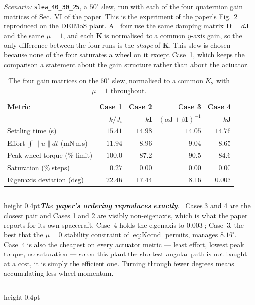 \documentclass[conference,10pt,a4paper]{IEEEtran}
\newcommand{\remarkrule}{\par\nobreak\vspace{2pt}%
  \hrule height 0.4pt\vspace{4pt}\nobreak}
\newenvironment{keybox}[1][Result]
  {\par\medskip\remarkrule\noindent\small\textbf{\textit{#1.}}\ \ignorespaces}
  {\par\vspace{3pt}\hrule height 0.4pt\par\medskip\ignorespacesafterend}
\newcommand{\mat}[1]{\bm{#1}}
\begin{document}
\textit{Scenario:} \texttt{slew\_40\_30\_25}, a $50^\circ$ slew, run with each
of the four quaternion gain matrices of Sec.~VI of the paper. This is the
experiment of the paper's Fig.~2 reproduced on the DEIMoS plant. All four use
the same damping matrix $\mat{D}=d\mat{J}$ and the same $\mu=1$, and each
$\mat{K}$ is normalised to a common $y$-axis gain, so the only difference
between the four runs is the \emph{shape} of $\mat{K}$. This slew is chosen
because none of the four saturates a wheel on it except Case~1, which keeps the
comparison a statement about the gain structure rather than about the actuator.

\begin{table}[!t]
\centering
\caption{The four gain matrices on the $50^\circ$ slew, normalised to a common
$K_2$ with $\mu=1$ throughout.}
\label{tab:compare}
\footnotesize
\begin{tabular}{@{}lrrrr@{}}
\toprule
\textbf{Metric} & \textbf{Case 1} & \textbf{Case 2} & \textbf{Case 3} & \textbf{Case 4} \\
 & $k/J_i$ & $k\mat{I}$ & $(\alpha\mat{J}{+}\beta\mat{I})^{-1}$ & $k\mat{J}$ \\
\midrule
Settling time (s)              & $15.41$ & $14.98$ & $14.05$ & $14.76$ \\
Effort $\int\|u\|dt$ (mN\,m\,s)& $11.94$ & $8.96$  & $9.04$  & $\bm{8.65}$ \\
Peak wheel torque (\% limit)   & $100.0$ & $87.2$  & $90.5$  & $\bm{84.6}$ \\
Saturation (\% steps)          & $0.27$  & $0.00$  & $0.00$  & $\bm{0.00}$ \\
Eigenaxis deviation (deg)      & $22.46$ & $17.44$ & $8.16$  & $\bm{0.003}$ \\
\bottomrule
\end{tabular}
\end{table}

\begin{keybox}[The paper's ordering reproduces exactly]
Cases 3 and 4 are the closest pair and Cases 1 and 2 are visibly
non-eigenaxis, which is what the paper reports for its own spacecraft. Case~4
holds the eigenaxis to $0.003^\circ$; Case~3, the best that the $\mu=0$
stability constraint of \cref{eq:Kcond} permits, manages $8.16^\circ$. Case~4
is also the cheapest on every actuator metric --- least effort, lowest peak
torque, no saturation --- so on this plant the shortest angular path is not
bought at a cost, it is simply the efficient one. Turning through fewer degrees
means accumulating less wheel momentum.
\end{keybox}
\end{document}
